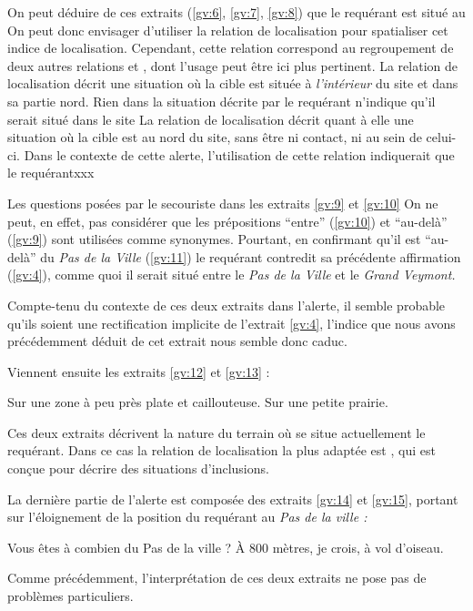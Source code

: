 On peut déduire de ces extraits (\ref{gv:6}, \ref{gv:7}, \ref{gv:8})
que le requérant est situé au
%
On peut donc envisager d'utiliser la relation de localisation
 pour spatialiser cet indice de
localisation. Cependant, cette relation correspond au regroupement de
deux autres relations  et
, dont l'usage peut être ici plus
pertinent.
%
La relation de localisation 
décrit une situation où la cible est située à \emph{l'intérieur} du
site et dans sa partie nord.
%
Rien dans la situation décrite par le requérant n'indique qu'il serait
situé dans le site
%
La relation de localisation  décrit
quant à elle une situation où la cible est au nord du site, sans être
ni contact, ni au sein de celui-ci.
%
Dans le contexte de cette alerte, l'utilisation de cette relation
indiquerait que le requérantxxx


%
Les questions posées par le secouriste dans les extraits \ref{gv:9} et
\ref{gv:10}
%
On ne peut, en effet, pas considérer que les prépositions
\enquote{entre} (\ref{gv:10}) et \enquote{au-delà} (\ref{gv:9}) sont
utilisées comme synonymes.
%
Pourtant, en confirmant qu'il est \enquote{au-delà} du \emph{Pas de la
  Ville} (\ref{gv:11}) le requérant contredit sa précédente
affirmation (\ref{gv:4}), comme quoi il serait situé entre le
\emph{Pas de la Ville} et le \emph{Grand Veymont.}

Compte-tenu du contexte de ces deux extraits dans l'alerte, il semble
probable qu'ils soient une rectification implicite de l'extrait
\ref{gv:4}, l'indice que nous avons précédemment déduit de cet extrait
nous semble donc caduc.

Viennent ensuite les extraits \ref{gv:12} et \ref{gv:13} :
%
\begin{dialogue}
  \Req {} Sur une zone à peu près plate et
  caillouteuse.  Sur une petite prairie.
\end{dialogue}
%
Ces deux extraits décrivent la nature du terrain où se situe
actuellement le requérant. Dans ce cas la relation de localisation la
plus adaptée est , qui est conçue pour
décrire des situations d'inclusions.


La dernière partie de l'alerte est composée des extraits \ref{gv:14}
et \ref{gv:15}, portant sur l'éloignement de la position du requérant
au \emph{Pas de la ville :}
%
\begin{dialogue}
  \Sec {} Vous êtes à combien du Pas de la ville ?
  \Req {} À 800 mètres, je crois, à vol d'oiseau.
\end{dialogue}
%
Comme précédemment, l'interprétation de ces deux extraits ne pose pas
de problèmes particuliers.


